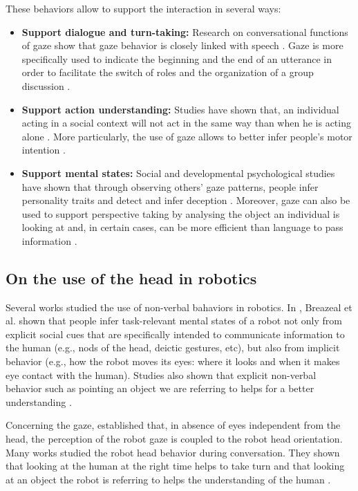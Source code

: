 \documentclass[english,a4paper,11pt,twoside]{StyleThese}
\begin{document}
These behaviors allow to support the interaction in several ways:
\begin{itemize}
\item \textbf{Support dialogue and turn-taking:} Research on conversational functions of gaze show that gaze behavior is closely linked with speech \cite{argyle1976gaze}. Gaze is more specifically used to indicate the beginning and the end of an utterance in order to facilitate the switch of roles \cite{kendon1967some} and the organization of a group discussion \cite{goffman1979footing}.
\item \textbf{Support action understanding:} Studies have shown that, an individual acting in a social context will not act in the same way than when he is acting alone \cite{becchio2010toward, vesper2010minimal}. More particularly, the use of gaze allows to better infer people's motor intention \cite{castiello2003understanding, pierno2006gaze}.
\item \textbf{Support mental states:} Social and developmental psychological studies have shown that through observing others’ gaze patterns, people infer personality traits \cite{kleinke1986gaze} and detect and infer deception \cite{hemsley1978effect}. Moreover, gaze can also be used to support perspective taking by analysing the object an individual is looking at \cite{furlanetto2013through} and, in certain cases, can be more efficient than language to pass information \cite{neider2010coordinating}.
\end{itemize}


\subsection{On the use of the head in robotics}

Several works studied the use of non-verbal bahaviors in robotics. In \cite{breazeal2005effects}, Breazeal et al. shown that people infer task-relevant mental states of a robot not only from explicit social cues that are specifically intended to communicate information to the human (e.g., nods of the head, deictic gestures, etc), but also from implicit behavior (e.g., how the robot moves its eyes: where it looks and when it makes eye contact with the human). Studies also shown that explicit non-verbal behavior such as pointing an object we are referring to helps for a better understanding \cite{haring2012studies, salem2011friendly}.

Concerning the gaze, \cite{imai2002robot} established that, in absence of eyes independent from the head, the perception of the robot gaze is coupled to the robot head orientation. Many works studied the robot head behavior during conversation. They shown that looking at the human at the right time helps to take turn \cite{boucher2010facilitative, skantze2014turn} and that looking at an object the robot is referring to helps the understanding of the human \cite{mutlu2009footing, staudte2011investigating}.
\end{document}
